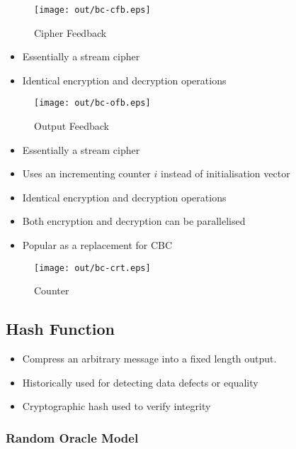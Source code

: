 \documentclass[a4paper]{article}
\begin{document}
\begin{figure}[h!]
  \centering
  \texttt{[image: out/bc-cfb.eps]}
  \caption{Cipher Feedback}
  \label{fig:bc-cfb}
\end{figure}
\FloatBarrier


\begin{itemize}
  \item Essentially a stream cipher
  \item Identical encryption and decryption operations
\end{itemize}

\begin{figure}[h!]
  \centering
  \texttt{[image: out/bc-ofb.eps]}
  \caption{Output Feedback}
  \label{fig:bc-ofc}
\end{figure}
\FloatBarrier


\begin{itemize}
  \item Essentially a stream cipher
  \item Uses an incrementing counter $i$ instead of initialisation vector
  \item Identical encryption and decryption operations
  \item Both encryption and decryption can be parallelised
  \item Popular as a replacement for CBC
\end{itemize}

\begin{figure}[h!]
  \centering
  \texttt{[image: out/bc-crt.eps]}
  \caption{Counter}
  \label{fig:bc-crt}
\end{figure}
\FloatBarrier

\subsection{Hash Function}

\begin{itemize}
  \item Compress an arbitrary message into a fixed length output.
  \item Historically used for detecting data defects or equality
  \item Cryptographic hash used to verify integrity
\end{itemize}

\subsubsection{Random Oracle Model}
\end{document}
